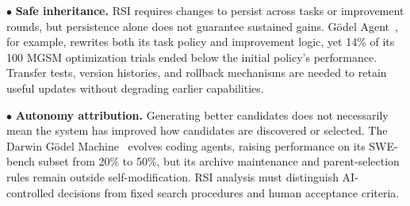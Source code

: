 \noindent$\bullet$ \textbf{Safe inheritance.} RSI requires changes to persist across tasks or improvement rounds, but persistence alone does not guarantee sustained gains. G\"odel Agent~\cite{yin2025godelagent}, for example, rewrites both its task policy and improvement logic, yet 14\% of its 100 MGSM optimization trials ended below the initial policy's performance. Transfer tests, version histories, and rollback mechanisms are needed to retain useful updates without degrading earlier capabilities. %

\noindent$\bullet$ \textbf{Autonomy attribution.} Generating better candidates does not necessarily mean the system has improved how candidates are discovered or selected. The Darwin G\"odel Machine~\cite{zhang2026dgm} evolves coding agents, raising performance on its SWE-bench subset from 20\% to 50\%, but its archive maintenance and parent-selection rules remain outside self-modification. RSI analysis must distinguish AI-controlled decisions from fixed search procedures and human acceptance criteria.

